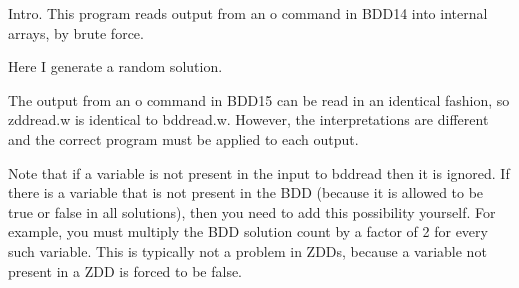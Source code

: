 
\datethis

Intro. This program reads output from an {\mc o} command in  {\mc
BDD14}
into internal arrays, by brute force.

Here I generate a random solution.

The output from an {\mc o} command in {\mc BDD15}
can be read in an identical fashion,
so {\mc zddread.w} is identical to {\mc bddread.w}.
However, the interpretations are different
and the correct program must be applied to each output.

Note that if a variable is not present in the input to {\mc bddread}
then it is ignored.
If there is a variable that is not present in the BDD
(because it is allowed to be true or false in all solutions),
then you need to add this possibility yourself.
For example, you must multiply the BDD solution count by a factor of 2
for every such variable.
This is typically not a problem in ZDDs,
because a variable not present in a ZDD is forced to be false.

